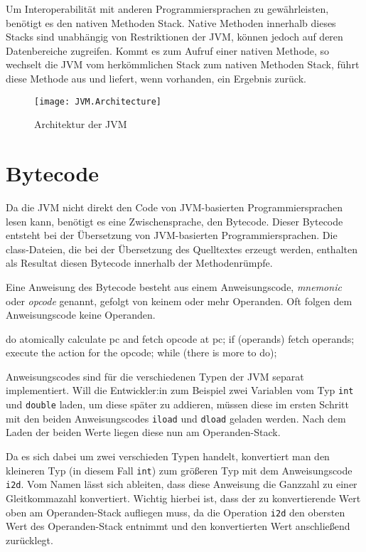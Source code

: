 Um Interoperabilität mit anderen Programmiersprachen zu gewährleisten, benötigt es den nativen Methoden Stack. Native Methoden innerhalb dieses Stacks sind unabhängig von Restriktionen der JVM, können jedoch auf deren Datenbereiche zugreifen. Kommt es zum Aufruf einer nativen Methode, so wechselt die JVM vom herkömmlichen Stack zum nativen Methoden Stack, führt diese Methode aus und liefert, wenn vorhanden, ein Ergebnis zurück.

\begin{figure}
    \caption{Architektur der JVM}
    \centering
    \texttt{[image: JVM.Architecture]}
    \label{fig:jvm-architecture}
\end{figure}

\section{Bytecode}

Da die JVM nicht direkt den Code von JVM-basierten Programmiersprachen lesen kann, benötigt es eine Zwischensprache, den Bytecode. Dieser Bytecode entsteht bei der Übersetzung von JVM-basierten Programmiersprachen. Die class-Dateien, die bei der Übersetzung des Quelltextes erzeugt werden, enthalten als Resultat diesen Bytecode innerhalb der Methodenrümpfe.

Eine Anweisung des Bytecode besteht aus einem Anweisungscode, \textit{mnemonic} oder \textit{opcode} genannt, gefolgt von keinem oder mehr Operanden. Oft folgen dem Anweisungscode keine Operanden.

\begin{JavaCode}[numbers=none, caption={Auszug aus der JVM Spezifikation, welche die Interpretationsschleife für Bytecode repräsentiert.}]
do {
    atomically calculate pc and fetch opcode at pc;
    if (operands) fetch operands;
    execute the action for the opcode;
} while (there is more to do);

\end{JavaCode}

Anweisungscodes sind für die verschiedenen Typen der JVM separat implementiert. Will die Entwickler:in zum Beispiel zwei Variablen vom Typ \texttt{int} und \texttt{double} laden, um diese später zu addieren, müssen diese im ersten Schritt mit den beiden Anweisungscodes \texttt{iload} und \texttt{dload} geladen werden. Nach dem Laden der beiden Werte liegen diese nun am Operanden-Stack. 

Da es sich dabei um zwei verschieden Typen handelt, konvertiert man den kleineren Typ (in diesem Fall \texttt{int}) zum größeren Typ mit dem Anweisungscode \texttt{i2d}. Vom Namen lässt sich ableiten, dass diese Anweisung die Ganzzahl zu einer Gleitkommazahl konvertiert. Wichtig hierbei ist, dass der zu konvertierende Wert oben am Operanden-Stack aufliegen muss, da die Operation \texttt{i2d} den obersten Wert des Operanden-Stack entnimmt und den konvertierten Wert anschließend zurücklegt.

